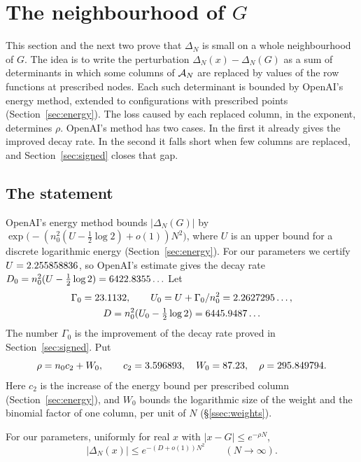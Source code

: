 \section{The neighbourhood of $G$}\label{sec:real}

This section and the next two prove that $\Delta_N$ is small on a whole neighbourhood of $G$. The idea is to
write the perturbation $\Delta_N(x)-\Delta_N(G)$ as a sum of determinants in which some columns of $\mathcal A_N$
are replaced by values of the row functions at prescribed nodes. Each such determinant is bounded by
OpenAI's energy method, extended to configurations with prescribed points (Section~\ref{sec:energy}). The
loss caused by each replaced column, in the exponent, determines $\rho$. OpenAI's method has two cases. In
the first it already gives the improved decay rate. In the second it falls short when few columns are
replaced, and Section~\ref{sec:signed} closes that gap.

\subsection{The statement}
OpenAI's energy method bounds $|\Delta_N(G)|$ by $\exp\bigl(-(n_0^2(U-\frac12\log2)+o(1))N^2\bigr)$, where $U$
is an upper bound for a discrete logarithmic energy (Section~\ref{sec:energy}). For our parameters we
certify $U=2.255858836$, so OpenAI's estimate gives the decay rate $D_0=n_0^2(U-\frac12\log2)=6422.8355\ldots$
Let
\begin{gather*}
 \Gamma_0=23.1132,\qquad U_0=U+\Gamma_0/n_0^2=2.2627295\ldots,\\
 D=n_0^2(U_0-\tfrac12\log2)=6445.9487\ldots
\end{gather*}
The number $\Gamma_0$ is the improvement of the decay rate proved in Section~\ref{sec:signed}. Put
\begin{equation}\label{eq:rho-def}
 \rho=n_0c_2+W_0,\qquad c_2=3.596893,\quad W_0=87.23,\quad \rho=295.849794 .
\end{equation}
Here $c_2$ is the increase of the energy bound per prescribed column (Section~\ref{sec:energy}), and $W_0$
bounds the logarithmic size of the weight and the binomial factor of one column, per unit of $N$
(\S\ref{ssec:weights}).

\begin{theorem}\label{thm:real}
For our parameters, uniformly for real $x$ with $|x-G|\le e^{-\rho N}$,
\[
 |\Delta_N(x)|\le e^{-(D+o(1))N^2}\qquad(N\to\infty).
\]
\end{theorem}

